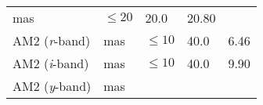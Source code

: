 \documentclass[DM,toc]{lsstdoc}
\begin{document}
\begin{longtable}[]{@{}lllll@{}}
\begin{minipage}[t]{0.08\columnwidth}
mas\strut
\end{minipage} & \begin{minipage}[t]{0.20\columnwidth}\raggedright\strut
\(\leq 20\)\strut
\end{minipage} & \begin{minipage}[t]{0.22\columnwidth}\raggedright\strut
20.0\strut
\end{minipage} & \begin{minipage}[t]{0.17\columnwidth}\raggedright\strut
20.80\strut
\end{minipage}\tabularnewline
\begin{minipage}[t]{0.19\columnwidth}\raggedright\strut
AM2 (\emph{r}-band)\strut
\end{minipage} & \begin{minipage}[t]{0.08\columnwidth}\raggedright\strut
mas\strut
\end{minipage} & \begin{minipage}[t]{0.20\columnwidth}\raggedright\strut
\(\leq 10\)\strut
\end{minipage} & \begin{minipage}[t]{0.22\columnwidth}\raggedright\strut
40.0\strut
\end{minipage} & \begin{minipage}[t]{0.17\columnwidth}\raggedright\strut
6.46\strut
\end{minipage}\tabularnewline
\begin{minipage}[t]{0.19\columnwidth}\raggedright\strut
AM2 (\emph{i}-band)\strut
\end{minipage} & \begin{minipage}[t]{0.08\columnwidth}\raggedright\strut
mas\strut
\end{minipage} & \begin{minipage}[t]{0.20\columnwidth}\raggedright\strut
\(\leq 10\)\strut
\end{minipage} & \begin{minipage}[t]{0.22\columnwidth}\raggedright\strut
40.0\strut
\end{minipage} & \begin{minipage}[t]{0.17\columnwidth}\raggedright\strut
9.90\strut
\end{minipage}\tabularnewline
\begin{minipage}[t]{0.19\columnwidth}\raggedright\strut
AM2 (\emph{y}-band)\strut
\end{minipage} & \begin{minipage}[t]{0.08\columnwidth}\raggedright\strut
mas\strut
\end{minipage} & \begin{minipage}[t]{0.20\columnwidth}\raggedright\strut

\end{minipage}
\end{longtable}
\end{document}
